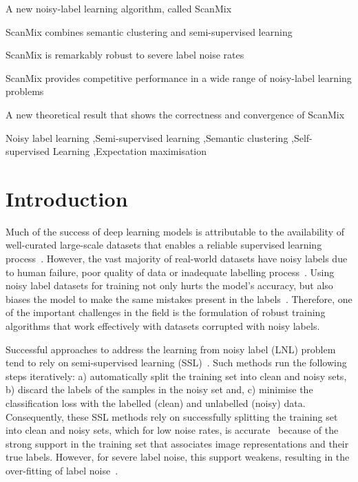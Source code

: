 \documentclass[review]{elsarticle}
\theoremstyle{plain}
\begin{document}
\begin{frontmatter}
\begin{highlights}
\item A new noisy-label learning algorithm, called ScanMix
\item ScanMix combines semantic clustering and semi-supervised learning
\item ScanMix is remarkably robust to severe label noise rates
\item  ScanMix provides competitive performance in a wide range of noisy-label learning problems
\item  A new theoretical result that shows the correctness and convergence of ScanMix
\end{highlights}

\begin{keyword}
Noisy label learning \sep Semi-supervised learning \sep Semantic clustering \sep Self-supervised Learning \sep  Expectation maximisation
\end{keyword}

\end{frontmatter}

\linenumbers

\section{Introduction}
\label{sec:introduction}

Much of the success of deep learning models is attributable to the availability of 
well-curated large-scale datasets that enables a reliable supervised learning process~\citep{litjens2017survey}.
However, the vast majority of real-world datasets have noisy labels due to human failure, poor quality of data or inadequate labelling process~\citep{frenay_survey}.
Using noisy label datasets for training not only hurts the model's accuracy, but also biases the model to make the same mistakes present in the labels~\citep{Zhang2017UnderstandingDL}.
Therefore, one of the important challenges in the field is the formulation of robust training algorithms that work effectively with datasets corrupted with noisy labels.


Successful approaches to address the learning from noisy label (LNL) problem tend to rely on semi-supervised learning (SSL)~\citep{ding2018semi,ortego2019towards,ortego2020multi,li2020dividemix}. Such methods run the following steps iteratively: a) automatically split the training set into clean and noisy sets, b) discard the labels of the samples in the noisy set and, c) minimise the classification loss with the labelled (clean) and unlabelled (noisy) data. 
Consequently, these SSL methods rely on successfully splitting the training set into clean and noisy sets, which for low noise rates, is  accurate~\citep{ding2018semi,ortego2019towards,ortego2020multi,li2020dividemix} because of the strong support in the training set that associates image representations and their true labels. However, for severe label noise, this support weakens, resulting in the over-fitting of label noise~\citep{ding2018semi,ortego2019towards,ortego2020multi,li2020dividemix}.
\end{document}
